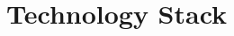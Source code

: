 \documentclass[12pt,a4paper]{article}
\begin{document}



\section{Technology Stack}
\end{document}
